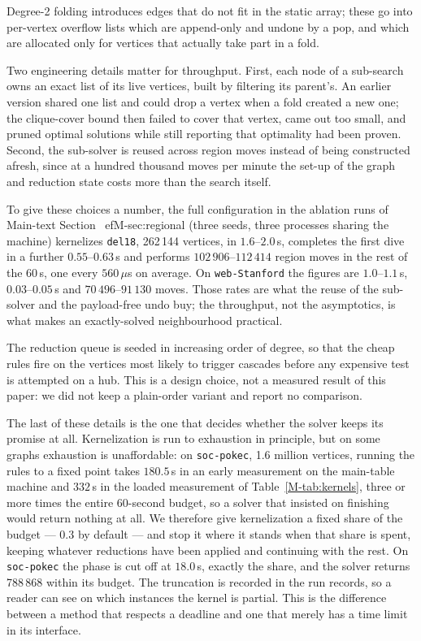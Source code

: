 \documentclass[preprint,authoryear,11pt]{elsarticle}
\theoremstyle{definition}
\begin{document}
Degree-2 folding introduces edges that do not fit in the static array; these go
into per-vertex overflow lists which are append-only and undone by a pop, and
which are allocated only for vertices that actually take part in a fold.

Two engineering details matter for throughput. First, each node of a sub-search
owns an exact list of its live vertices, built by filtering its parent's. An
earlier version shared one list and could drop a vertex when a fold created a new
one; the clique-cover bound then failed to cover that vertex, came out too small,
and pruned optimal solutions while still reporting that optimality had been
proven. Second, the sub-solver is reused across region moves instead of being
constructed afresh, since at a hundred thousand moves per minute the set-up of
the graph and reduction state costs more than the search itself.

To give these choices a number, the full configuration in the ablation runs of
Main-text Section~
ef{M-sec:regional} (three seeds, three processes sharing the machine)
kernelizes \texttt{del18}, 262\,144 vertices, in $1.6$--$2.0$\,s, completes the
first dive in a further $0.55$--$0.63$\,s and performs $102\,906$--$112\,414$
region moves in the rest of the 60\,s, one every $560\,\mu$s on average. On
\texttt{web-Stanford} the figures are $1.0$--$1.1$\,s, $0.03$--$0.05$\,s and
$70\,496$--$91\,130$ moves. Those rates are what the reuse of the sub-solver and
the payload-free undo buy; the throughput, not the asymptotics, is what makes
an exactly-solved neighbourhood practical.

The reduction queue is seeded in increasing order of degree, so that the cheap
rules fire on the vertices most likely to trigger cascades before any expensive
test is attempted on a hub. This is a design choice, not a measured result of
this paper: we did not keep a plain-order variant and report no comparison.

The last of these details is the one that decides whether the solver keeps its
promise at all. Kernelization is run to exhaustion in principle, but on some
graphs exhaustion is unaffordable: on \texttt{soc-pokec}, 1.6 million vertices,
running the rules to a fixed point takes $180.5$\,s in an early measurement on
the main-table machine and $332$\,s in the loaded measurement of
Table~\ref{M-tab:kernels}, three or more times the entire 60-second budget, so a
solver that insisted on finishing would return nothing at all. We therefore give kernelization a fixed share of the budget --- $0.3$ by
default --- and stop it where it stands when that share is spent, keeping
whatever reductions have been applied and continuing with the rest. On
\texttt{soc-pokec} the phase is cut off at $18.0$\,s, exactly the share, and the
solver returns 788\,868 within its budget. The truncation is recorded in the
run records, so a reader can see on which instances the kernel is partial.
This is the difference between a method that respects a deadline and one that
merely has a time limit in its interface.
\end{document}
